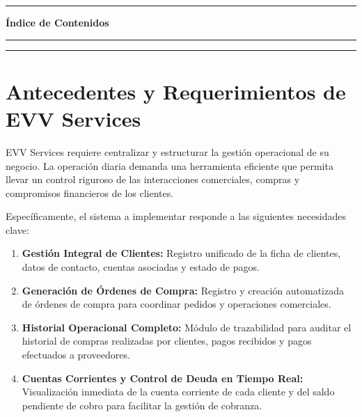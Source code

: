 \documentclass[11pt,letterpaper]{article}
\begin{document}
\newpage
\thispagestyle{fancy}

{\color{foundersBlue}\rule{\textwidth}{1.2pt}}
\vspace{0.4cm}

{\Large \textbf{Índice de Contenidos}}

\vspace{0.3cm}
{\color{foundersBlue}\rule{\textwidth}{0.4pt}}

\vspace{0.4cm}

{
  \hypersetup{linkcolor=foundersBlue}
  \renewcommand{\contentsname}{}
  \vspace{-1.2cm}
  \tableofcontents
}

\vfill
{\color{foundersBlue}\rule{\textwidth}{0.4pt}}


\newpage
\section{Antecedentes y Requerimientos de EVV Services}

EVV Services requiere centralizar y estructurar la gestión operacional de su negocio. La operación diaria demanda una herramienta eficiente que permita llevar un control riguroso de las interacciones comerciales, compras y compromisos financieros de los clientes.

Específicamente, el sistema a implementar responde a las siguientes necesidades clave:
\begin{enumerate}[leftmargin=1.4em]
  \item \textbf{Gestión Integral de Clientes:} Registro unificado de la ficha de clientes, datos de contacto, cuentas asociadas y estado de pagos.
  \item \textbf{Generación de Órdenes de Compra:} Registro y creación automatizada de órdenes de compra para coordinar pedidos y operaciones comerciales.
  \item \textbf{Historial Operacional Completo:} Módulo de trazabilidad para auditar el historial de compras realizadas por clientes, pagos recibidos y pagos efectuados a proveedores.
  \item \textbf{Cuentas Corrientes y Control de Deuda en Tiempo Real:} Visualización inmediata de la cuenta corriente de cada cliente y del saldo pendiente de cobro para facilitar la gestión de cobranza.
\end{enumerate}
\end{document}
